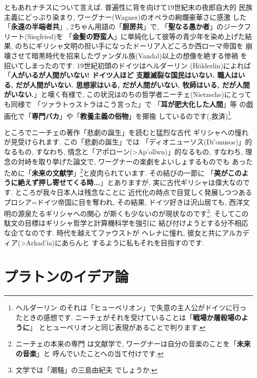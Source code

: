 \documentclass[b5j,8pt,twocolumn]{ltjsarticle}
\newcommand{\textgreek}[1]{\begingroup\fontencoding{LGR}\selectfont#1\endgroup}
\begin{document}
ともあれナチスについて言えば, 普遍性に背を向けて19世紀末の夜郎自大的
民族主義にどっぷり染まり, ワーグナー(Wagner)のオペラの絢爛豪華さに感激
した「\textbf{永遠の半端者共}」, 2ちゃん用語の「\textbf{厨房共}」で,
 「\textbf{聖なる愚か者}」のジークフリート(Siegfried)を
「\textbf{金髪の野蛮人}」に単純化して彼等の青少年を染め上げた結果,
 のちにギリシャ文明の担い手になったドーリア人どころか西ローマ帝国を
崩壊させて暗黒時代を招来したヴァンダル族(Vandal)以上の想像を絶する惨禍
を招いてしまったのです. 19世紀初頭のドイツはヘルダーリン
(H\"olderlin)によれば「\textbf{人がいるが人間がいない! ドイツ人ほど
支離滅裂な国民はいない. 職人はいる, だが人間がいない. 思想家はいる,
 だが人間がいない. 牧師はいる, だが人間がいない.}」と嘆く有様で,
 この状況はのちの哲学者ニーチェ(Nietzsche)にとっても同様で
「ツァラトゥストラはこう言った」で 「\textbf{耳が肥大化した人間}」等
の戯画化で「\textbf{専門バカ}」や「\textbf{教養主義の俗物}」を揶揄
しているのです(\cite{ツァラトゥストラ},救済)\footnote{ヘルダーリン
のそれは「ヒューペリオン」で失意の主人公がドイツに行ったときの感想です.
 ニーチェがそれを受けていることは「\textbf{戦場か屠殺場のように}」
 とヒューペリオンと同じ表現があることで判ります.}.
\newline

ところでニーチェの著作「悲劇の誕生」\cite{悲劇の誕生}を読むと猛烈な古代
ギリシャへの憧れが見受けられます. この「悲劇の誕生」では
「ディオニューソス(\textgreek{Di'onusos})」的なるもの, すなわち,
情念と「アポローン(\textgreek{>Ap'ollwn})」的なるもの, すなわち,
 理念の対峙を取り挙げた論文で, ワーグナーの楽劇をよいしょするものでも
あったために「\textbf{未来の文献学}」\footnote{ニーチェの本来の専門
は文献学で, ワーグナーは自分の音楽のことを「\textbf{未来の音楽}」と
呼んでいたことへの当て付けです.}と皮肉られています. その結びの一節に
「\textbf{美がこのように絶えず押し寄せてくる時...}」とありますが,
 実に古代ギリシャは偉大なのです. ところが我々日本人は残念なことに
近代化の時点で目覚しく発展しつつあるプロシア=ドイツ帝国に目を奪われ,
 その結果, ドイツ好きは沢山居ても, 西洋文明の源泉たるギリシャへの関心
が斯くも少ないのが現状なのです\footnote{文学では「潮騒」の三島由紀夫
でしょうか.}. そしてこの駄文の目標はギリシャ哲学と計算機科学を強引に
結び付けようとする分不相応な企てなのです. 時代を越えてファウストが
ヘレナに憧れ, 彼女と共にアルカディア(\textgreek{>Arkad'ia})にあらんと
するように私もそれを目指すのです.

\section{プラトンのイデア論}
\end{document}
